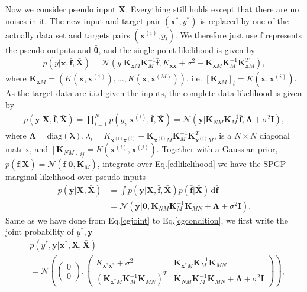 \documentclass[10pt,a4paper]{article}
\begin{document}
Now we consider pseudo input $\bar{\pmb{X}}$. Everything still holds except that there are no noises in it. The new input and target pair $(\pmb{x}^*,y^*)$ is replaced by one of the actually data set and targets pairs $(\pmb{x}^{(i)},y_i)$. We therefore just use $\bar{\pmb{f}}$ represents the pseudo outputs and $\bar{\pmb{\theta}}$, and the single point likelihood is given by
\begin{align}
p(y|\pmb{x},\bar{\pmb{f}},\bar{\pmb{X}})=\mathcal{N}(y|\pmb{K}_{\pmb{x}M}\pmb{K}_M^{-1}\bar{\pmb{f}},K_{\pmb{x}\pmb{x}}+\sigma^2-\pmb{K}_{\pmb{x}M}\pmb{K}_M^{-1}\pmb{K}_{\pmb{x}M}^T),
\end{align}
where $\pmb{K}_{\pmb{x}M}=(K(\pmb{x},\bar{\pmb{x}}^{(1)}),\dots,K(\pmb{x},\bar{\pmb{x}}^{(M)}))$, i.e. $[\pmb{K}_{\pmb{x}M}]_{i}=K(\pmb{x},\bar{\pmb{x}}^{(i)})$.
As the target data are i.i.d given the inputs, the complete data likelihood is given by
\begin{align}
p(\pmb{y}|\pmb{X},\bar{\pmb{f}},\bar{\pmb{X}})=\prod^N_{i=1}p(y_i|\pmb{x}^{(i)},\bar{\pmb{f}},\bar{\pmb{X}})=\mathcal{N}(\pmb{y}|\pmb{K}_{NM}\pmb{K}_M^{-1}\bar{\pmb{f}}, \pmb{\Lambda}+\sigma^2\pmb{I}),
\label{cdlikelihood}
\end{align}
where $\pmb{\Lambda}=\text{diag}(\pmb{\lambda}),\lambda_i = K_{\pmb{x}^{(i)}\pmb{x}^{(i)}}-\pmb{K}_{\pmb{x}^{(i)}M}\pmb{K}_M^{-1}\pmb{K}_{\pmb{x}^{(i)}M}^T$, is a $N\times N$ diagonal matrix, and $[\pmb{K}_{NM}]_{ij}=K(\pmb{x}^{(i)},\pmb{x}^{(j)})$.
Together with a Gaussian prior, $p(\bar{\pmb{f}}|\bar{\pmb{X}})=\mathcal{N}(\bar{\pmb{f}}|\pmb{0},\pmb{K}_M)$, integrate over Eq.\ref{cdlikelihood} we have the SPGP marginal likelihood over pseudo inputs
\begin{align}
p(\pmb{y}|\pmb{X},\bar{\pmb{X}})&=\int p(\pmb{y}|\pmb{X},\bar{\pmb{f}},\bar{\pmb{X}})p(\bar{\pmb{f}}|\bar{\pmb{X}})\,\mathrm{d}\bar{\pmb{f}}\nonumber\\
&=\mathcal{N}(\pmb{y}|\pmb{0},\pmb{K}_{NM}\pmb{K}_M^{-1}\pmb{K}_{MN}+\pmb{\Lambda}+\sigma^2\pmb{I}).
\label{spgpmarginallikelihood}
\end{align}
Same as we have done from Eq.\ref{cgjoint} to Eq.\ref{cgcondition}, we first write the joint probability of $y^*,\pmb{y}$
\begin{align}
&p(y^*,\pmb{y}|\pmb{x}^*,\pmb{X},\bar{\pmb{X}})\\\nonumber
&=\mathcal{N}\left(\begin{pmatrix}
0\\0
\end{pmatrix},\begin{pmatrix}
 K_{\pmb{x}^*\pmb{x}^*}+\sigma^2 & \pmb{K}_{\pmb{x}^*M}\pmb{K}_M^{-1}\pmb{K}_{MN}\\
(\pmb{K}_{\pmb{x}^*M}\pmb{K}_M^{-1}\pmb{K}_{MN})^T & \pmb{K}_{NM}\pmb{K}_M^{-1}\pmb{K}_{MN}+\pmb{\Lambda}+\sigma^2\pmb{I}
\end{pmatrix}\right),
\end{align}
\end{document}
